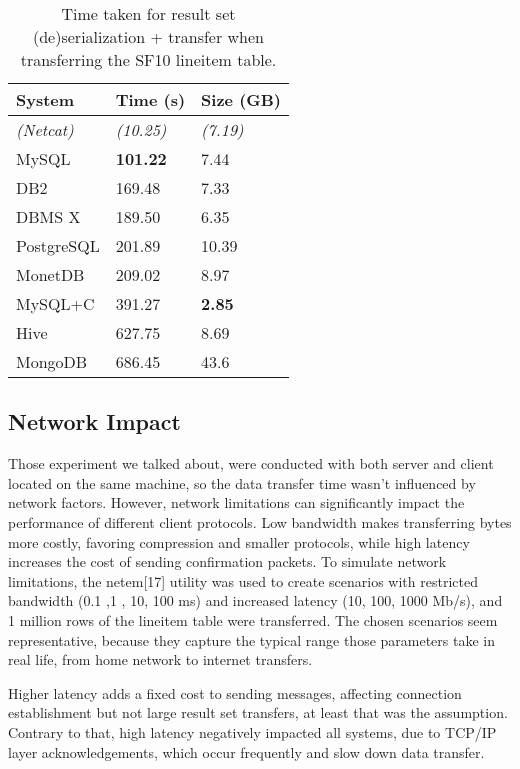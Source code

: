 \documentclass[sigconf]{acmart}
\begin{document}
\begin{table}[h!]
    \centering
    \caption{Time taken for result set (de)serialization + transfer when transferring the SF10 lineitem table.}
    \begin{tabular}{ p{2cm} | p{2cm}  p{2cm} }
        \textbf{System} & \textbf{Time (s)} & \textbf{Size (GB)} \\ \hline
        \textit{(Netcat)} & \textit{(10.25)} & \textit{(7.19)} \\ \hline
        MySQL & \textbf{101.22} & 7.44 \\ \hline
        DB2 & 169.48 & 7.33 \\ \hline
        DBMS X & 189.50 & 6.35 \\ \hline
        PostgreSQL & 201.89 & 10.39 \\ \hline
        MonetDB & 209.02 & 8.97 \\ \hline
        MySQL+C & 391.27 & \textbf{2.85} \\ \hline
        Hive & 627.75 & 8.69 \\ \hline
        MongoDB & 686.45 & 43.6
    \end{tabular}
\end{table}

\subsection{Network Impact}
Those experiment we talked about, were conducted with both server and client located on the same machine, so the data transfer time wasn't influenced by network factors. However, network limitations can significantly impact the performance of different client protocols. Low bandwidth makes transferring bytes more costly, favoring compression and smaller protocols, while high latency increases the cost of sending confirmation packets.
To simulate network limitations, the netem[17] utility was used to create scenarios with restricted bandwidth (0.1 ,1 , 10, 100 ms) and increased latency (10, 100, 1000 Mb/s), and 1 million rows of the lineitem table were transferred. The chosen scenarios seem representative, because they capture the typical range those parameters take in real life, from home network to internet transfers.

Higher latency adds a fixed cost to sending messages, affecting connection establishment but not large result set transfers, at least that was the assumption. Contrary to that, high latency negatively impacted all systems, due to TCP/IP layer acknowledgements, which occur frequently and slow down data transfer.
\end{document}
